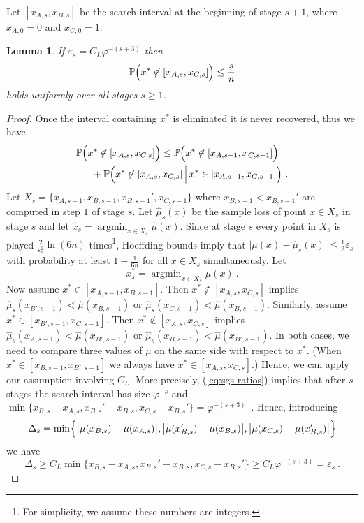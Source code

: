 \documentclass[11pt]{hackednow}
\newtheorem{lemma}{Lemma}[chapter]
\renewcommand{\P}{\mathbb{P}}
\newcommand{\wh}{\widehat}
\newcommand{\argmin}{\mathop{\mathrm{argmin}}}
\newcommand{\ve}{\varepsilon}
\newcommand{\xhat}{\wh{x}}
\newcommand{\muhat}{\wh{\mu}}
\begin{document}
Let $[x_{A,s},x_{B,s}]$ be the search interval at the beginning of stage $s+1$, where $x_{A,0} = 0$ and $x_{C,0} = 1$.
\begin{lemma}
If $\ve_s = C_L\varphi^{-(s+3)}$ then
\[
    \P\Bigl(x^* \not\in [x_{A,s},x_{C,s}]\Bigr) \le \frac{s}{n}
\]
holds uniformly over all stages $s \ge 1$.
\end{lemma}
%
\begin{proof}
Once the interval containing $x^*$ is eliminated it is never recovered, thus we have
\begin{align}
\nonumber
    \P&\Bigl(x^* \not\in [x_{A,s},x_{C,s}]\Bigr)
\le
    \P\Bigl(x^* \not\in [x_{A,s-1},x_{C,s-1}]\Bigr)
\\ &\quad
\label{eq:sgs-rec}
    + \P\Bigl(x^* \not\in [x_{A,s},x_{C,s}] \,\Big|\, x^* \in [x_{A,s-1},x_{C,s-1}]\Bigr)~.
\end{align}
Let $X_s = \{x_{A,s-1},x_{B,s-1},x_{B,s-1}',x_{C,s-1}\}$ where $x_{B,s-1} < x_{B,s-1}'$ are computed in step $1$ of stage $s$.
Let $\muhat_s(x)$ be the sample loss of point $x\in X_s$ in stage $s$ and let $\xhat_s = \argmin_{x\in X_s}\muhat(x)$. Since at stage $s$ every point in $X_s$ is played $\tfrac{2}{\ve_s^2}\ln(6n)$ times\footnote{For simplicity, we assume these numbers are integers.}, Hoeffding bounds imply that $\bigl|\mu(x)-\muhat_s(x)\bigr| \le \tfrac{1}{2}\ve_s$ with probability at least $1-\tfrac{1}{6n}$ for all $x\in X_s$ simultaneously. Let
\[
    x^*_s = \argmin_{x\in X_s}\mu(x)~.
\]
Now assume $x^* \in [x_{A,s-1},x_{B,s-1}]$. Then $x^* \not\in [x_{A,s},x_{C,s}]$ implies $\muhat_s(x_{B',s-1}) < \muhat(x_{B,s-1})$ or $\muhat_s(x_{C,s-1}) < \muhat(x_{B,s-1})$. Similarly, assume $x^* \in [x_{B',s-1},x_{C,s-1}]$. Then $x^* \not\in [x_{A,s},x_{C,s}]$ implies $\muhat_s(x_{A,s-1}) < \muhat(x_{B',s-1})$ or $\muhat_s(x_{B,s-1}) < \muhat(x_{B',s-1})$. In both cases, we need to compare three values of $\mu$ on the same side with respect to $x^*$. (When $x^* \in [x_{B,s-1},x_{B',s-1}]$ we always have $x^* \in [x_{A,s},x_{C,s}]$.) Hence, we can apply our assumption involving $C_L$. More precisely, (\ref{eq:sgs-ratios}) implies that after $s$ stages the search interval has size $\varphi^{-s}$ and $\min\{x_{B,s}-x_{A,s}, x_{B,s}'-x_{B,s}, x_{C,s} - x_{B,s}'\} = \varphi^{-(s+3)}$~. Hence, introducing
\[
    \Delta_s = \min\Bigl\{\big|\mu(x_{B,s})-\mu(x_{A,s})\big|, \big|\mu(x_{B,s}')-\mu(x_{B,s})\big|, \big|\mu(x_{C,s}) - \mu(x_{B,s}')\big|\Bigr\}
\]
we have
\[
    \Delta_s
\ge
    C_L\min\{x_{B,s}-x_{A,s}, x_{B,s}'-x_{B,s}, x_{C,s} - x_{B,s}'\} \ge C_L\varphi^{-(s+3)} = \ve_s~.
\]
\end{proof}
\end{document}
